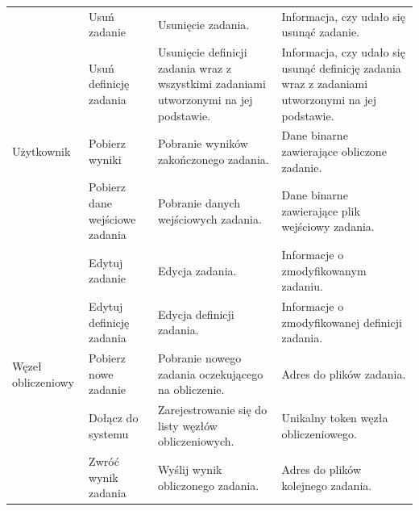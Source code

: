 \documentclass[a4paper,11pt,twoside]{report}
\theoremstyle{definition}
\begin{document}
\begin{longtable}{| p{} | p{} | p{} | p{} |}
                & Usuń zadanie
                & Usunięcie zadania.
                & Informacja, czy udało się usunąć zadanie. \\ \cline{2-4} 
                
                & Usuń definicję zadania
                & Usunięcie definicji zadania wraz z wszystkimi zadaniami utworzonymi na jej podstawie.
                & Informacja, czy udało się usunąć definicję zadania wraz z zadaniami utworzonymi na jej podstawie. \\ \cline{1-4} 
                
                Użytkownik
                & Pobierz wyniki
                & Pobranie wyników zakończonego zadania.
                & Dane binarne zawierające obliczone zadanie. \\ \cline{2-4} 
                
                & Pobierz dane wejściowe zadania
                & Pobranie danych wejściowych zadania.
                & Dane binarne zawierające plik wejściowy zadania. \\ \cline{2-4} 
                
                & Edytuj zadanie                 
                & Edycja zadania.
                & Informacje o zmodyfikowanym zadaniu. \\ \cline{2-4} 
                
                & Edytuj definicję zadania
                & Edycja definicji zadania.
                & Informacje o zmodyfikowanej definicji zadania. \\ \hline
                
                Węzeł obliczeniowy
                & Pobierz nowe zadanie
                & Pobranie nowego zadania oczekującego na obliczenie.
                & Adres do plików zadania. \\ \cline{2-4} 
                
                & Dołącz do systemu
                & Zarejestrowanie się do listy węzłów obliczeniowych.
                & Unikalny token węzła obliczeniowego. \\ \cline{2-4} 
                
                & Zwróć wynik zadania
                & Wyślij wynik obliczonego zadania.
                & Adres do plików kolejnego zadania. \\ \hline
                
            \end{longtable}
                        
\end{document}
